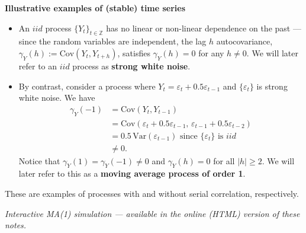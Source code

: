 \documentclass[
  letterpaper,
  DIV=11,
  numbers=noendperiod]{scrartcl}
\newcommand{\slidelabel}[1]{{\color{embernavy}\bfseries\large #1\par\vspace{5pt}}}
\newenvironment{slidefooter}{%
  \par\vspace{7pt}{\color{emberrule}\rule{\linewidth}{0.4pt}}\par\vspace{4pt}%
  \color{emberamber}\itshape\small}{\par}
\begin{document}
\begin{slidebox}

\slidelabel{Illustrative examples of (stable) time series}

\begin{itemize}
\item
  An \(iid\) process \(\{Y_t\}_{t \in \mathbb{Z}}\) has no linear or
  non-linear dependence on the past --- since the random variables are
  independent, the lag \(h\) autocovariance,
  \(\gamma_Y(h) := \text{Cov}(Y_t, Y_{t+h})\), satisfies
  \(\gamma_Y(h) = 0\) for any \(h \neq 0\). We will later refer to an
  \(iid\) process as \textbf{strong white noise}.
\item
  By contrast, consider a process where
  \(Y_t = \varepsilon_t + 0.5\varepsilon_{t-1}\) and
  \(\{\varepsilon_t\}\) is strong white noise. We have
  \[\begin{aligned} \gamma_Y(-1) &= \text{Cov}(Y_t, Y_{t-1})\\ &= \text{Cov}(\varepsilon_t + 0.5\varepsilon_{t-1},\, \varepsilon_{t-1} + 0.5\varepsilon_{t-2})\\ &= 0.5\,\text{Var}(\varepsilon_{t-1}) \text{ since }\{\varepsilon_t\}\text{ is $iid$}\\ &\neq 0.\end{aligned}\]
  Notice that \(\gamma_Y(1) = \gamma_Y(-1) \neq 0\) and
  \(\gamma_Y(h) = 0\) for all \(|h| \geq 2\). We will later refer to
  this as a \textbf{moving average process of order 1}.
\end{itemize}

\begin{slidefooter}

These are examples of processes with and without serial correlation,
respectively.

\end{slidefooter}

\end{slidebox}

\begin{tcolorbox}[enhanced jigsaw, arc=.35mm, bottomrule=.15mm, bottomtitle=1mm, breakable, colback=white, colbacktitle=quarto-callout-note-color!10!white, colframe=quarto-callout-note-color-frame, coltitle=black, left=2mm, leftrule=.75mm, opacityback=0, opacitybacktitle=0.6, rightrule=.15mm, title=\textcolor{quarto-callout-note-color}{\faInfo}\hspace{0.5em}{Watch: Live Simulation}, titlerule=0mm, toprule=.15mm, toptitle=1mm]

\emph{Interactive MA(1) simulation --- available in the online (HTML)
version of these notes.}

\end{tcolorbox}
\end{document}

